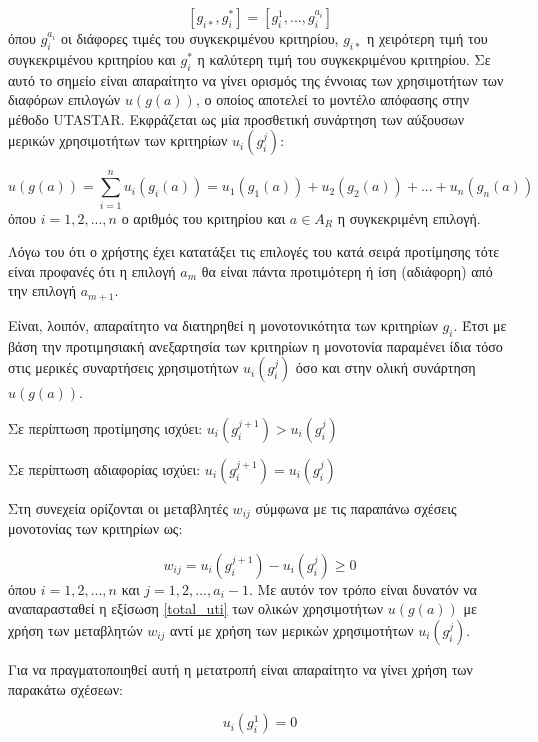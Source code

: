\documentclass[11pt,a4paper,titlepage]{article}
\numberwithin{equation}{section}
\begin{document}
\begin{equation}\label{initial_inter}
[g_{i*},g^{*}_{i}] = [g^{1}_{i}, ..., g^{a_{i}}_{i}]
\end{equation}
όπου $g^{a_{i}}_{i}$ οι διάφορες τιμές του συγκεκριμένου κριτηρίου, $g_{i*}$ η χειρότερη τιμή του συγκεκριμένου κριτηρίου και $g^{*}_{i}$ η καλύτερη τιμή του συγκεκριμένου κριτηρίου. 	
Σε αυτό το σημείο είναι απαραίτητο να γίνει ορισμός της έννοιας των χρησιμοτήτων των διαφόρων επιλογών $u(g(a))$, ο οποίος αποτελεί το μοντέλο απόφασης στην μέθοδο UTASTAR. Eκφράζεται ως μία προσθετική συνάρτηση των αύξουσων μερικών χρησιμοτήτων των κριτηρίων $u_{i}(g^{j}_{i})$:

\begin{equation}\label{total_uti}
	u(g(a)) = \sum_{i=1}^{n} u_{i}(g_{i}(a)) = u_{1}(g_{1}(a)) + u_{2}(g_{2}(a)) + ... + u_{n}(g_{n}(a))
\end{equation}
όπου $i = 1,2,...,n$ ο αριθμός του κριτηρίου και $a\in A_{R}$ η συγκεκριμένη επιλογή.

Λόγω του ότι ο χρήστης έχει κατατάξει τις επιλογές του κατά σειρά προτίμησης τότε είναι προφανές ότι η επιλογή $a_{m}$ θα είναι πάντα προτιμότερη ή ίση (αδιάφορη) από την επιλογή $a_{m+1}$.    

Είναι, λοιπόν, απαραίτητο να διατηρηθεί η μονοτονικότητα των κριτηρίων $g_{i}$. Έτσι με βάση την προτιμησιακή ανεξαρτησία των κριτηρίων η μονοτονία παραμένει ίδια τόσο στις μερικές συναρτήσεις χρησιμοτήτων $u_{i}(g^{j}_{i})$ όσο και στην ολική συνάρτηση  $u(g(a))$.

\centerline{Σε περίπτωση προτίμησης ισχύει: $u_{i}(g^{j+1}_{i}) > u_{i}(g^{j}_{i})$}

\centerline{Σε περίπτωση αδιαφορίας ισχύει: $u_{i}(g^{j+1}_{i}) = u_{i}(g^{j}_{i})$}

Στη συνεχεία ορίζονται οι μεταβλητές $w_{ij}$ σύμφωνα με τις παραπάνω σχέσεις μονοτονίας των κριτηρίων ως:

\begin{equation}\label{def_w}
	w_{ij} = u_{i}(g^{j+1}_{i}) - u_{i}(g^{j}_{i}) \geq 0
\end{equation}
όπου $i = 1,2,...,n$ και $j = 1,2,...,a_{i}-1$. Με αυτόν τον τρόπο είναι δυνατόν να αναπαρασταθεί η εξίσωση \ref{total_uti} των ολικών χρησιμοτήτων $u(g(a))$ με χρήση των μεταβλητών $w_{ij}$ αντί με χρήση των μερικών χρησιμοτήτων $u_{i}(g^{j}_{i})$. 

Για να πραγματοποιηθεί αυτή η μετατροπή είναι απαραίτητο να γίνει χρήση των παρακάτω σχέσεων:

\begin{equation}\label{zero_crit}
	u_{i}(g^{1}_{i}) = 0
\end{equation}
\end{document}
